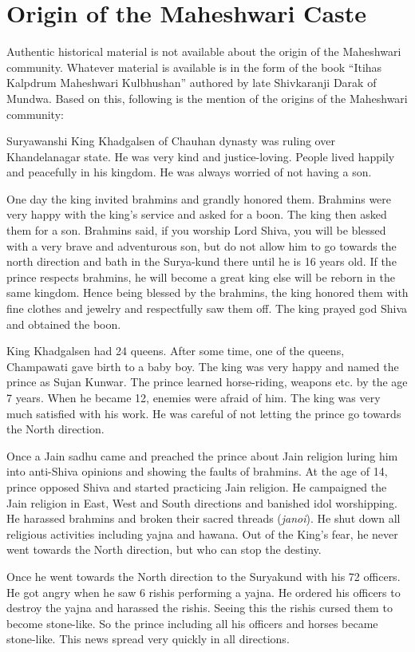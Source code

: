 \chapter{Origin of the Maheshwari Caste}
Authentic historical material is not available about the origin of the Maheshwari community. Whatever material is available is in the form of the book ``Itihas Kalpdrum Maheshwari Kulbhushan'' authored by late Shivkaranji Darak of Mundwa. Based on this, following is the mention of the origins of the Maheshwari community:

Suryawanshi King Khadgalsen of Chauhan dynasty was ruling over Khandelanagar state. He was very kind and justice-loving. People lived happily and peacefully in his kingdom. He was always worried of not having a son.

One day the king invited brahmins and grandly honored them. Brahmins were very happy with the king's service and asked for a boon. The king then asked them for a son. Brahmins said, if you worship Lord Shiva, you will be blessed with a very brave and adventurous son, but do not allow him to go towards the north direction and bath in the Surya-kund there until he is 16 years old. If the prince respects brahmins, he will become a great king else will be reborn in the same kingdom. Hence being blessed by the brahmins, the king honored them with fine clothes and jewelry and respectfully saw them off. The king prayed god Shiva and obtained the boon.

King Khadgalsen had 24 queens. After some time, one of the queens, Champawati gave birth to a baby boy. The king was very happy and named the prince as Sujan Kunwar. The prince learned horse-riding, weapons etc. by the age 7 years. When he became 12, enemies were afraid of him. The king was very much satisfied with his work. He was careful of not letting the prince go towards the North direction.

Once a Jain sadhu came and preached the prince about Jain religion luring him into anti-Shiva opinions and showing the faults of brahmins. At the age of 14, prince opposed Shiva and started practicing Jain religion. He campaigned the Jain religion in East, West and South directions and banished idol worshipping. He harassed brahmins and broken their sacred threads (\textit{janoi}). He shut down all religious activities including yajna and hawana. Out of the King's fear, he never went towards the North direction, but who can stop the destiny.

Once he went towards the North direction to the Suryakund with his 72 officers. He got angry when he saw 6 rishis performing a yajna. He ordered his officers to destroy the yajna and harassed the rishis. Seeing this the rishis cursed them to become stone-like. So the prince including all his officers and horses became stone-like. This news spread very quickly in all directions.

